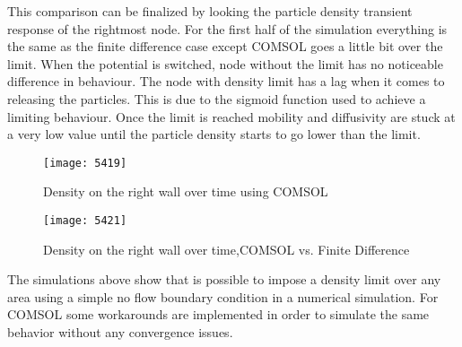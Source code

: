 \begin{doublespace}
This comparison can be finalized by looking the particle density transient response of the rightmost node. For the first half of the simulation everything is the same as the finite difference case except COMSOL goes a little bit over the limit. When the potential is switched, node without the limit has no noticeable difference in behaviour. The node with density limit has a lag when it comes to releasing the particles. This is due to the sigmoid function used to achieve a limiting behaviour. Once the limit is reached mobility and diffusivity are stuck at a very low value until the particle density starts to go lower than the limit.
\begin{figure}[ht]
\centering
\begin{minipage}[b]{0.45\linewidth}
\texttt{[image: 5419]}
\caption{Density on the right wall over time using COMSOL}
\label{5419}
\end{minipage}
\quad
\begin{minipage}[b]{0.45\linewidth}
\texttt{[image: 5421]}
\caption{Density on the right wall over time,COMSOL vs. Finite Difference}
\label{5421}
\end{minipage}
\end{figure}

The simulations above show that is possible to impose a density limit over any area using a simple no flow boundary condition in a numerical simulation. For COMSOL some workarounds are implemented in order to simulate the same behavior without any convergence issues. 


\end{doublespace}
